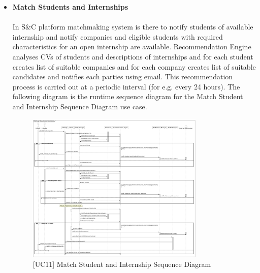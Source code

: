\begin{itemize}
\begin{figure}[H]
    \caption{\label{fig:metamodel9}[UC10] Accept/Reject Application Sequence Diagram}
    \end{figure}
    \item \textbf{Match Students and Internships} \\ \\
    In S\&C platform matchmaking system is there to notify students of available internship and notify companies and eligible students with required characteristics for an open internship are available. Recommendation Engine analyses CVs of students and descriptions of internships and for each student creates list of suitable companies and for each company creates list of suitable candidates and notifies each parties using email. This recommendation process is carried out at a periodic interval (for e.g. every 24 hours). The following diagram is the runtime sequence diagram for the Match Student and Internship Sequence Diagram use case.
    \begin{figure}[H]
    \centering
    \includegraphics[width=0.8\textwidth]{Images/Match_Student_Internship_Sequence_diagram.png}
    \caption{\label{fig:metamodel9}[UC11] Match Student and Internship Sequence Diagram}
    

\end{figure}
\end{itemize}
